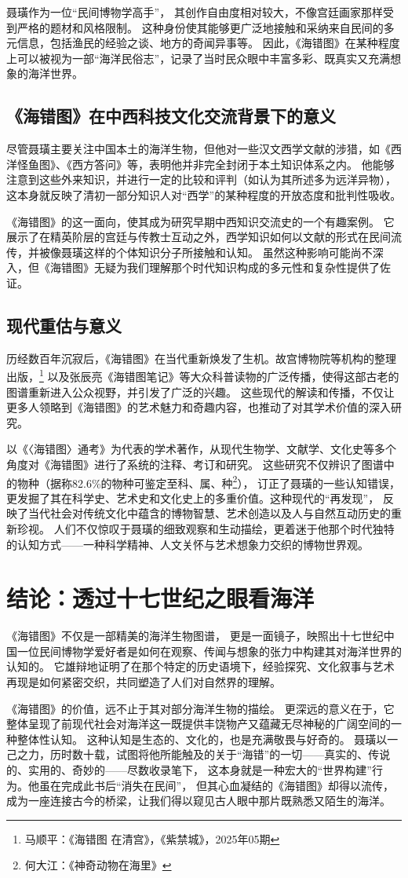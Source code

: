 \documentclass{source/Paper}
\begin{document}
聂璜作为一位“民间博物学高手”，
其创作自由度相对较大，不像宫廷画家那样受到严格的题材和风格限制。
这种身份使其能够更广泛地接触和采纳来自民间的多元信息，包括渔民的经验之谈、地方的奇闻异事等。
因此，《海错图》在某种程度上可以被视为一部“海洋民俗志”，记录了当时民众眼中丰富多彩、既真实又充满想象的海洋世界。
\subsection{《海错图》在中西科技文化交流背景下的意义}
尽管聂璜主要关注中国本土的海洋生物，但他对一些汉文西学文献的涉猎，如《西洋怪鱼图》、《西方答问》等，表明他并非完全封闭于本土知识体系之内。
他能够注意到这些外来知识，并进行一定的比较和评判（如认为其所述多为远洋异物），这本身就反映了清初一部分知识人对“西学”的某种程度的开放态度和批判性吸收。

《海错图》的这一面向，使其成为研究早期中西知识交流史的一个有趣案例。
它展示了在精英阶层的宫廷与传教士互动之外，西学知识如何以文献的形式在民间流传，并被像聂璜这样的个体知识分子所接触和认知。
虽然这种影响可能尚不深入，但《海错图》无疑为我们理解那个时代知识构成的多元性和复杂性提供了佐证。
\subsection{现代重估与意义}
历经数百年沉寂后，《海错图》在当代重新焕发了生机。故宫博物院等机构的整理出版，\footnote{马顺平：《\textlangle 海错图 \textrangle 在清宫》，《紫禁城》，2025年05期}
以及张辰亮《海错图笔记》等大众科普读物的广泛传播，使得这部古老的图谱重新进入公众视野，并引发了广泛的兴趣。
这些现代的解读和传播，不仅让更多人领略到《海错图》的艺术魅力和奇趣内容，也推动了对其学术价值的深入研究。

以《〈海错图〉通考》为代表的学术著作，从现代生物学、文献学、文化史等多个角度对《海错图》进行了系统的注释、考订和研究。
这些研究不仅辨识了图谱中的物种（据称82.6\%的物种可鉴定至科、属、种\footnote{何大江：《神奇动物在海里》}），
订正了聂璜的一些认知错误，更发掘了其在科学史、艺术史和文化史上的多重价值。这种现代的“再发现”，
反映了当代社会对传统文化中蕴含的博物智慧、艺术创造以及人与自然互动历史的重新珍视。
人们不仅惊叹于聂璜的细致观察和生动描绘，更着迷于他那个时代独特的认知方式——一种科学精神、人文关怀与艺术想象力交织的博物世界观。
\section{结论：透过十七世纪之眼看海洋}
《海错图》不仅是一部精美的海洋生物图谱，
更是一面镜子，映照出十七世纪中国一位民间博物学爱好者是如何在观察、传闻与想象的张力中构建其对海洋世界的认知的。
它雄辩地证明了在那个特定的历史语境下，经验探究、文化叙事与艺术再现是如何紧密交织，共同塑造了人们对自然界的理解。

《海错图》的价值，远不止于其对部分海洋生物的描绘。
更深远的意义在于，它整体呈现了前现代社会对海洋这一既提供丰饶物产又蕴藏无尽神秘的广阔空间的一种整体性认知。
这种认知是生态的、文化的，也是充满敬畏与好奇的。
聂璜以一己之力，历时数十载，试图将他所能触及的关于“海错”的一切——真实的、传说的、实用的、奇妙的——尽数收录笔下，
这本身就是一种宏大的“世界构建”行为。他虽在完成此书后“消失在民间”，
但其心血凝结的《海错图》却得以流传，成为一座连接古今的桥梁，让我们得以窥见古人眼中那片既熟悉又陌生的海洋。
\end{document}
